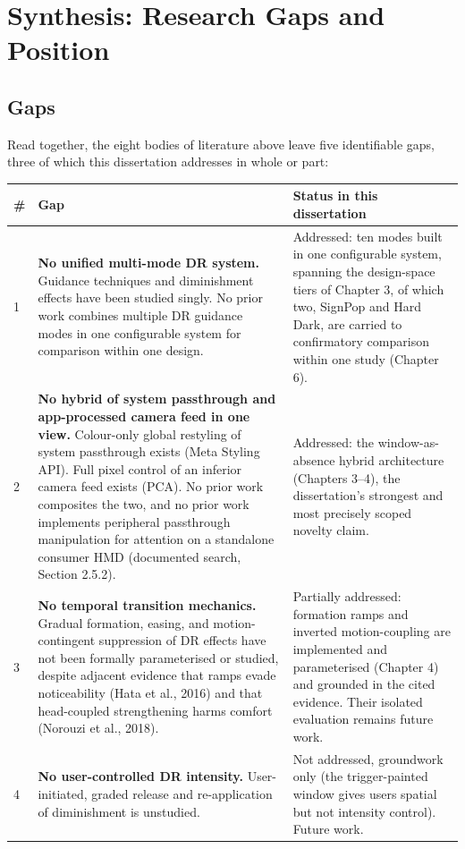 \section{Synthesis: Research Gaps and Position}

\subsection{Gaps}

Read together, the eight bodies of literature above leave five identifiable gaps, three of which this
dissertation addresses in whole or part:

\begin{longtable}{|p{}|p{}|p{}|}
\hline
\textbf{\#} & \textbf{Gap} & \textbf{Status in this dissertation} \\
\hline
\endhead
1 & \textbf{No unified multi-mode DR system.} Guidance techniques and diminishment effects have been studied singly. No prior work combines multiple DR guidance modes in one configurable system for comparison within one design. & Addressed: ten modes built in one configurable system, spanning the design-space tiers of Chapter 3, of which two, SignPop and Hard Dark, are carried to confirmatory comparison within one study (Chapter 6). \\
\hline
2 & \textbf{No hybrid of system passthrough and app-processed camera feed in one view.} Colour-only global restyling of system passthrough exists (Meta Styling API). Full pixel control of an inferior camera feed exists (PCA). No prior work composites the two, and no prior work implements peripheral passthrough manipulation for attention on a standalone consumer HMD (documented search, Section 2.5.2). & Addressed: the window-as-absence hybrid architecture (Chapters 3–4), the dissertation's strongest and most precisely scoped novelty claim. \\
\hline
3 & \textbf{No temporal transition mechanics.} Gradual formation, easing, and motion-contingent suppression of DR effects have not been formally parameterised or studied, despite adjacent evidence that ramps evade noticeability (Hata et al., 2016) and that head-coupled strengthening harms comfort (Norouzi et al., 2018). & Partially addressed: formation ramps and inverted motion-coupling are implemented and parameterised (Chapter 4) and grounded in the cited evidence. Their isolated evaluation remains future work. \\
\hline
4 & \textbf{No user-controlled DR intensity.} User-initiated, graded release and re-application of diminishment is unstudied. & Not addressed, groundwork only (the trigger-painted window gives users spatial but not intensity control). Future work. \\

\end{longtable}
